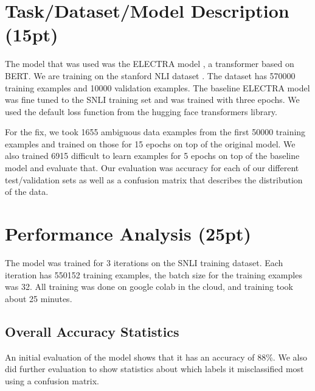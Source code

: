 \documentclass[twocolumn]{article}
\begin{document}
\section{Task/Dataset/Model Description (15pt)}

The model that was used was the ELECTRA model \cite{clark2020electra}, a
transformer based on BERT. We are training  on the stanford NLI dataset
\cite{bowman2015large}. The dataset has 570000 training examples and 10000
validation examples. The baseline ELECTRA model was fine tuned to the SNLI
training set and was trained with three epochs. We used the default loss
function from the hugging face transformers library. 

For the fix, we took 1655 ambiguous data examples from the first 50000 training
examples and trained on those for 15 epochs on top of the original model. We
also trained 6915 difficult to learn examples for 5 epochs on top of the
baseline model and evaluate that. Our evaluation was accuracy for each of our
different test/validation sets as well as a confusion matrix that describes the
distribution of the data.


\section{Performance Analysis (25pt)}

The model was trained for 3 iterations on the SNLI training dataset. Each
iteration has 550152 training examples, the batch size for the training examples
was 32. All training was done on google colab in the cloud, and training took
about 25 minutes.

\subsection*{Overall Accuracy Statistics}

An initial evaluation of the model shows that it has an accuracy of 88\%. We
also did further evaluation to show statistics about which labels it
misclassified most using a confusion matrix.
\end{document}
